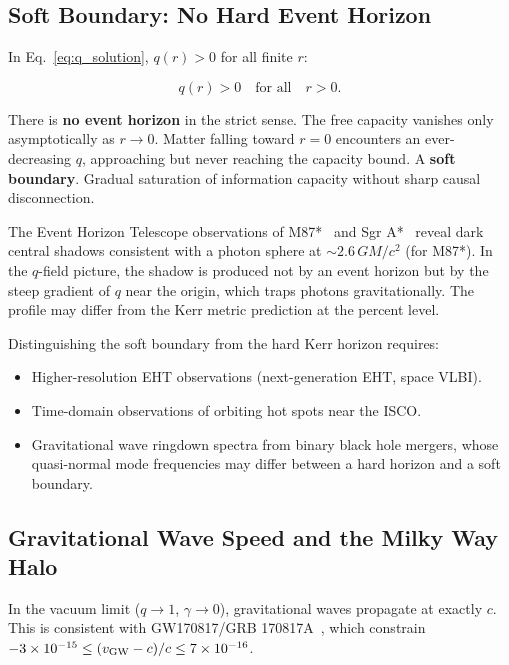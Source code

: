 \documentclass[aps,prd,twocolumn,showpacs,superscriptaddress,preprintnumbers]{revtex4-2}
\begin{document}
\subsection{Soft Boundary: No Hard Event Horizon}

In Eq.~\eqref{eq:q_solution}, $q(r)>0$ for all finite $r$:

\begin{equation}
q(r) > 0 \quad \text{for all} \quad r > 0.
\label{eq:soft}
\end{equation}

There is \textbf{no event horizon} in the strict sense.
The free capacity vanishes only asymptotically as $r\to0$.
Matter falling toward $r=0$ encounters an ever-decreasing $q$, approaching but never reaching the capacity bound.
A \textbf{soft boundary}. Gradual saturation of information capacity without sharp causal disconnection.

The Event Horizon Telescope observations of M87*~\cite{EventHorizonTelescope:2019dse} and Sgr A*~\cite{EventHorizonTelescope:2022xnr} reveal dark central shadows consistent with a photon sphere at $\sim2.6\,GM/c^2$ (for M87*).
In the $q$-field picture, the shadow is produced not by an event horizon but by the steep gradient of $q$ near the origin, which traps photons gravitationally.
The profile may differ from the Kerr metric prediction at the percent level.

Distinguishing the soft boundary from the hard Kerr horizon requires:
\begin{itemize}
    \item Higher-resolution EHT observations (next-generation EHT, space VLBI).
    \item Time-domain observations of orbiting hot spots near the ISCO.
    \item Gravitational wave ringdown spectra from binary black hole mergers, whose quasi-normal mode frequencies may differ between a hard horizon and a soft boundary.
\end{itemize}

\subsection{Gravitational Wave Speed and the Milky Way Halo}
\label{sec:gw170817_halo}

In the vacuum limit ($q\to1$, $\gamma\to0$), gravitational waves propagate at exactly $c$.
This is consistent with GW170817/GRB 170817A~\cite{Abbott:2017apx,GW170817grb}, which constrain $-3\times10^{-15}\leq(v_{\rm GW}-c)/c\leq7\times10^{-16}$.
\end{document}
